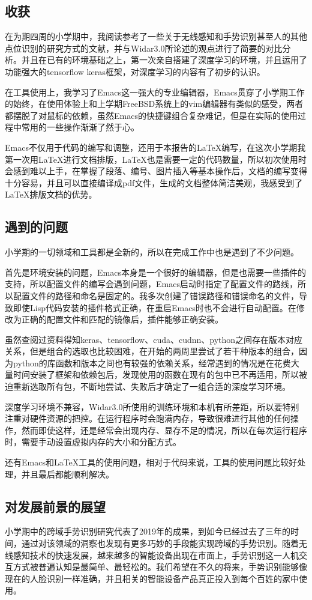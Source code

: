 \documentclass[a4paper]{article}
\begin{document}
\subsection{收获}
  在为期四周的小学期中，我阅读参考了一些关于无线感知和手势识别甚至人的其他点位识别的研究方式的文献，并与Widar3.0所论述的观点进行了简要的对比分析。并且在已有的环境基础之上，第一次亲自搭建了深度学习的环境，并且运用了功能强大的tensorflow keras框架，对深度学习的内容有了初步的认识。 \par
  在工具使用上，我学习了Emacs这一强大的专业编辑器，Emacs贯穿了小学期工作的始终，在使用体验上和上学期FreeBSD系统上的vim编辑器有类似的感受，两者都摆脱了对鼠标的依赖，虽然Emacs的快捷键组合复杂难记，但是在实际的使用过程中常用的一些操作渐渐了然于心。 \par
  Emacs不仅用于代码的编写和调整，还用于本报告的LaTeX编写，在这次小学期我第一次用LaTeX进行文档排版，LaTeX也是需要一定的代码数量，所以初次使用时会感到难以上手，在掌握了段落、编号、图片插入等基本操作后，文档的编写变得十分容易，并且可以直接编译成pdf文件，生成的文档整体简洁美观，我感受到了LaTeX排版文档的优势。
  \subsection{遇到的问题}
  小学期的一切领域和工具都是全新的，所以在完成工作中也是遇到了不少问题。 \par
  首先是环境安装的问题，Emacs本身是一个很好的编辑器，但是也需要一些插件的支持，所以配置文件的编写会遇到问题，Emacs启动时指定了配置文件的路线，所以配置文件的路径和命名是固定的。我多次创建了错误路径和错误命名的文件，导致即使Lisp代码安装的插件格式正确，在重启Emacs时也不会进行自动配置。在修改为正确的配置文件和匹配的镜像后，插件能够正确安装。 \par
  虽然查阅过资料得知keras、tensorflow、cuda、cudnn、python之间存在版本对应关系，但是组合的选取也比较困难，在开始的两周里尝试了若干种版本的组合，因为python的库函数和版本之间也有较强的依赖关系，经常遇到的情况是在花费大量时间安装了框架和依赖包后，发现使用的函数在现有的包中已不再适用，所以被迫重新选取所有包，不断地尝试、失败后才确定了一组合适的深度学习环境。 \par
  深度学习环境不兼容，Widar3.0所使用的训练环境和本机有所差距，所以要特别注重对硬件资源的把控。在运行程序时会跑满内存，导致很难进行其他的任何操作，然而即使这样，还是经常会出现内存、显存不足的情况，所以在每次运行程序时，需要手动设置虚拟内存的大小和分配方式。 \par
  还有Emacs和LaTeX工具的使用问题，相对于代码来说，工具的使用问题比较好处理，并且最后都能顺利解决。
  \subsection{对发展前景的展望}
  小学期中的跨域手势识别研究代表了2019年的成果，到如今已经过去了三年的时间，通过对该领域的洞察也发现有更多巧妙的手段能实现跨域的手势识别。随着无线感知技术的快速发展，越来越多的智能设备出现在市面上，手势识别这一人机交互方式被普遍认知是最简单、最轻松的。我们希望在不久的将来，手势识别能够像现在的人脸识别一样准确，并且相关的智能设备产品真正投入到每个百姓的家中使用。

 \clearpage
  
\end{document}
